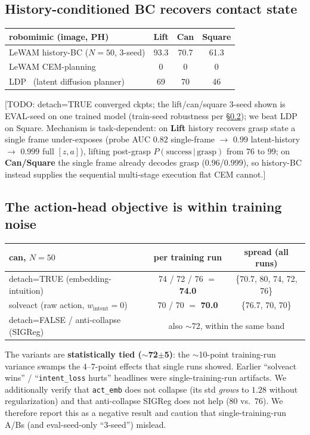 \documentclass[11pt]{article}
\newcommand{\todo}[1]{{\color{red}[TODO: #1]}}
\begin{document}
\subsection{History-conditioned BC recovers contact state}\label{sec:history}
\begin{center}\small
\begin{tabular}{@{}lccc@{}}
\toprule
robomimic (image, PH) & Lift & Can & Square \\
\midrule
LeWAM history-BC ($N{=}50$, 3-seed) & 93.3 & 70.7 & 61.3 \\
LeWAM CEM-planning & 0 & 0 & 0 \\
LDP~\cite{ldp} (latent diffusion planner) & 69 & 70 & 46 \\
\bottomrule
\end{tabular}
\end{center}
\todo{detach=TRUE converged ckpts; the lift/can/square 3-seed shown is EVAL-seed on one trained model (train-seed robustness per \S\ref{sec:negative}); we beat LDP on Square. Mechanism is task-dependent: on \textbf{Lift} history recovers grasp state a single frame under-exposes (probe AUC $0.82$ single-frame $\to$ $0.99$ latent-history $\to$ $0.999$ full $[z,a]$), lifting post-grasp $P(\text{success}\,|\,\text{grasp})$ from $76$ to $99$; on \textbf{Can/Square} the single frame already decodes grasp ($0.96$/$0.999$), so history-BC instead supplies the sequential multi-stage execution flat CEM cannot.}

\subsection{The action-head objective is within training noise}\label{sec:negative}
\begin{center}\small
\begin{tabular}{@{}lcc@{}}
\toprule
can, $N{=}50$ & per training run & spread (all runs) \\
\midrule
detach=TRUE (embedding-intuition) & 74 / 72 / 76 $=$ \textbf{74.0} & \{70.7, 80, 74, 72, 76\} \\
solveact (raw action, $w_{\text{intent}}{=}0$) & 70 / 70 $=$ \textbf{70.0} & \{76.7, 70, 70\} \\
detach=FALSE / anti-collapse (SIGReg) & \multicolumn{2}{c}{also $\sim$72, within the same band} \\
\bottomrule
\end{tabular}
\end{center}
The variants are \textbf{statistically tied ($\sim$72$\pm$5)}: the $\sim$10-point training-run variance swamps the $4$--$7$-point effects that single runs showed. Earlier ``solveact wins'' / ``\texttt{intent\_loss} hurts'' headlines were single-training-run artifacts. We additionally verify that \texttt{act\_emb} does not collapse (its std \emph{grows} to $1.28$ without regularization) and that anti-collapse SIGReg does not help ($80$ vs.\ $76$). We therefore report this as a negative result and caution that single-training-run A/Bs (and eval-seed-only ``3-seed'') mislead.
\end{document}
